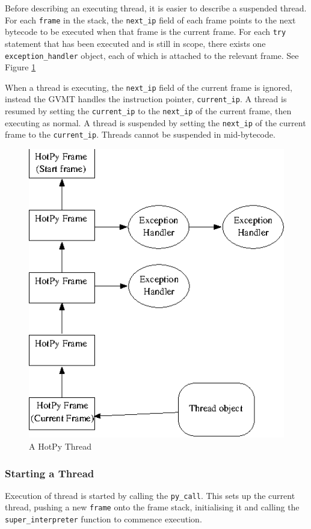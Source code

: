 Before describing an executing thread, it is easier to describe a suspended thread. For each \verb|frame| in the stack, the \verb|next_ip| field of each frame points to the next bytecode to be executed when that frame is the current frame. For each \verb|try| statement that has been executed and is still in scope, there exists one \verb|exception_handler| object, each of which is attached to the relevant frame. See Figure \ref{fig:stack}

When a thread is executing, the \verb|next_ip| field of the current frame is ignored,
instead the GVMT handles the instruction pointer, \verb|current_ip|.
A thread is resumed by setting the \verb|current_ip| to the \verb|next_ip| of the current frame, then executing as normal.
A thread is suspended by setting the \verb|next_ip| of the current frame to the \verb|current_ip|.
Threads cannot be suspended in mid-bytecode.

\begin{figure}[htb]
 \centering
 \includegraphics[scale = 1.1]{./vm_stack.eps}
 \caption{A HotPy Thread\label{fig:stack}}
\end{figure}

\subsubsection{Starting a Thread}
Execution of thread is started by calling the \verb|py_call|. This sets up the current thread, pushing a new \verb|frame| onto the frame stack, initialising it and calling the \verb|super_interpreter| function to commence execution.


